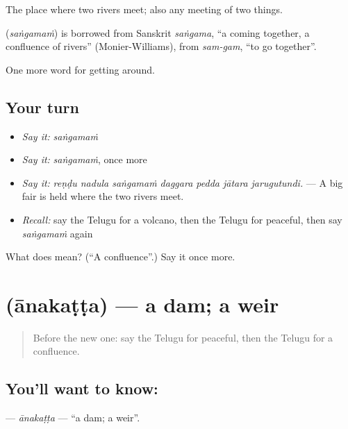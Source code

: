 The place where two rivers meet; also any meeting of two things.

\begin{cousinweb}
\textbf{} (\emph{saṅgamaṁ}) is borrowed from Sanskrit \emph{saṅgama}, \textquotedblleft{}a coming together, a confluence of rivers\textquotedblright{} (Monier-Williams), from \emph{sam-gam}, \textquotedblleft{}to go together\textquotedblright{}.
\end{cousinweb}

\begin{grammarlens}[title={What you've built}]
One more word for getting around.
\end{grammarlens}

\subsection*{Your turn}
\begin{itemize}
\raggedright
  \item \emph{Say it:} \emph{saṅgamaṁ}
  \item \emph{Say it:} \emph{saṅgamaṁ}, once more
  \item \emph{Say it:} \emph{reṇḍu nadula saṅgamaṁ daggara pedda jātara jarugutundi.} — A big fair is held where the two rivers meet.
  \item \emph{Recall:} say the Telugu for a volcano, then the Telugu for peaceful, then say \emph{saṅgamaṁ} again
\end{itemize}

\begin{tcolorbox}[breakable,colback=teal!4,colframe=teal!35!black,title={Before you move on}]
What does  mean? (\textquotedblleft{}A confluence\textquotedblright{}.) Say it once more.
\end{tcolorbox}
\section[\texorpdfstring{\te{ఆనకట్ట} (ānakaṭṭa)}{ఆనకట్ట (ānakaṭṭa)}]{ (ānakaṭṭa) — a dam; a weir}

\label{lesson:TE-C475-anakatta}



\begin{quote}
Before the new one: say the Telugu for peaceful, then the Telugu for a confluence.
\end{quote}

\subsection*{You'll want to know: }
\textbf{} — \emph{ānakaṭṭa} — \textquotedblleft{}a dam; a weir\textquotedblright{}.

